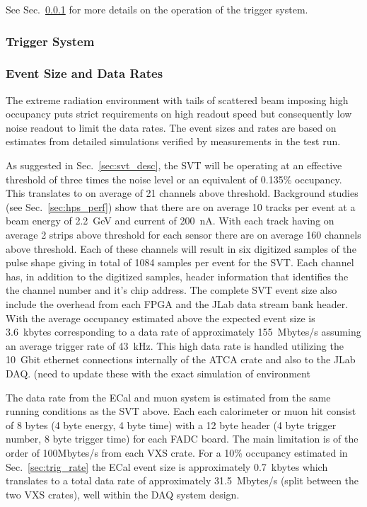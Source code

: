 See Sec.~\ref{sec:triggerdaq} for more details on the operation of the trigger system.


\subsubsection{Trigger System}
\label{sec:triggerdaq}


\subsubsection{Event Size and Data Rates}
The extreme radiation environment with tails of scattered beam imposing high occupancy
 puts strict requirements on high readout speed but consequently low noise readout to limit 
 the data rates. The event sizes and rates are based on estimates from detailed simulations 
 verified by measurements in the test run. 
  
As suggested in Sec.~\ref{sec:svt_desc}, the SVT will be operating at an effective threshold of three
times the noise level or an equivalent of 0.135\% occupancy. This translates to on average of 21 channels above threshold. Background studies (see Sec.~\ref{sec:hps_perf}) show that 
there are on average 10 tracks per event at a beam energy of 2.2~GeV and current of 
200~nA. With each track 
having on average 2 strips above threshold for each sensor there are on average 160 channels above threshold. Each of these channels will result in six digitized samples of the 
pulse shape giving in total of 1084 samples per event for the SVT.
Each channel has, in addition to the digitized samples,  header information that identifies the 
the channel number and it's chip address. The complete SVT event size also 
include the overhead from each FPGA and the JLab data stream bank header.  
With the average occupancy 
estimated above the expected event size is 3.6~kbytes corresponding to a data rate of 
approximately 155~Mbytes/s assuming an average trigger rate of 43~kHz.  
This high data rate is handled utilizing 
the 10~Gbit ethernet connections internally of the ATCA crate and also to the JLab DAQ.
{\color{red} (need to update these with the exact simulation of environment}


The data rate from the ECal and muon system is estimated from the same running 
conditions as the SVT above. 
Each each calorimeter or muon hit consist of 8 bytes (4 byte energy, 4 byte time)
 with a 12 byte header (4 byte trigger number, 8 byte trigger time) for each FADC board. 
 The main limitation is of the order of 100Mbytes/s from each VXS crate. For a 
 10\% occupancy estimated in Sec.~\ref{sec:trig_rate} the ECal event size is approximately 0.7~kbytes which translates to a total data rate of approximately 31.5~Mbytes/s 
(split between the two VXS crates), well within the DAQ system design. 

